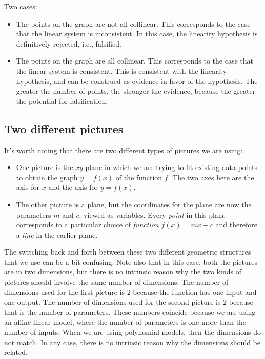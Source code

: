 \documentclass[10pt]{amsart}
\begin{document}
\begin{enumerate}
Two cases:

  \begin{itemize}
  \item The points on the graph are not all collinear. This
    corresponds to the case that the linear system is inconsistent. In
    this case, the linearity hypothesis is definitively rejected,
    i.e., falsified.
  \item The points on the graph are all collinear. This corresponds to
    the case that the linear system is consistent. This is consistent
    with the linearity hypothesis, and can be construed as evidence in
    favor of the hypothesis. The greater the number of points, the
    stronger the evidence, because the greater the potential for
    falsification.
  \end{itemize}
\end{enumerate}

\subsection{Two different pictures}

It's worth noting that there are two different types of pictures we
are using:

\begin{itemize}
\item One picture is the $xy$-plane in which we are trying to fit
  existing data points to obtain the graph $y = f(x)$ of the function
  $f$. The two axes here are the axis for $x$ and the axis for $y =
  f(x)$.
\item The other picture is a plane, but the coordinates for the plane
  are now the parameters $m$ and $c$, viewed as variables. Every {\em
    point} in this plane corresponds to a particular choice of {\em
    function} $f(x) = mx + c$ and therefore a {\em line} in the
  earlier plane.
\end{itemize}

The switching back and forth between these two different geometric
structures that we use can be a bit confusing. Note also that in this
case, both the pictures are in two dimensions, but there is no
intrinsic reason why the two kinds of pictures should involve the same
number of dimensions. The number of dimensions used for the first
picture is 2 because the function has one input and one output. The
number of dimensions used for the second picture is 2 because that is
the number of parameters. These numbers coincide because we are using
an affine linear model, where the number of parameters is one more
than the number of inputs. When we are using polynomial models, then
the dimensions do not match. In any case, there is no intrinsic reason
why the dimensions should be related.
\end{document}
